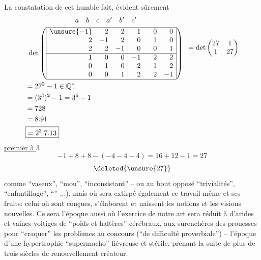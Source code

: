  La constatation de cet humble fait, évident sûrement
\[\begin{aligned}
&\begin{array}{c}
\begin{array}{rrrrrr}a&b&c&a'&b'&c'\end{array}\\[.3em]
\det\left(\begin{array}{|rrr|rrr|}\hline
\unsure{-1}&2&2&1&0&0\\
2&-1&2&0&1&0\\
2&2&-1&0&0&1\\\hline
1&0&0&-1&2&2\\
0&1&0&2&-1&2\\
0&0&1&2&2&-1\\\hline
\end{array}\right)
\end{array}
=\det\begin{pmatrix}27&1\\1&27\end{pmatrix}\\
&=27^2-1\in\mathbb Q^*\\
&=(3^3)^2-1=3^6-1\\
&=728\\
&=8.91\\
&\boxed{=2^3.7.13}
\end{aligned}\]
\uline{premier à $3$}
\[-1+8+8-(-4-4-4)=16+12-1=27\]
\[\deleted{\unsure{27}}\]
 comme ``vaseux'', ``mou'', ``inconsistant'' -- ou au bout opposé ``trivialités'', ``enfantillage'', ``'' ...), mais où sera extirpé également ce travail même et ses fruits: celui où sont conçues, s'élaborent et naissent les notions et les visions nouvelles. Ce sera l'époque aussi où l'exercice de notre art sera réduit à d'arides et vaines voltiges de ``poids et haltères'' cérébraux, aux surenchères des prouesses pour ``craquer'' les problèmes au concours (``de difficulté proverbiale'') -- l'époque d'une hypertrophie ``supermacho'' fiévreuse et stérile, prenant la suite de plus de trois siècles de renouvellement créateur.

